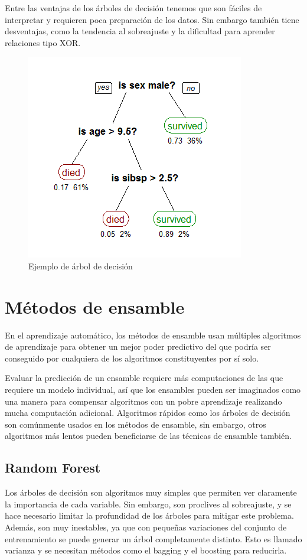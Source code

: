 Entre las ventajas de los árboles de decisión tenemos que son fáciles de interpretar y requieren poca preparación de los datos. Sin embargo también tiene desventajas, como la tendencia al sobreajuste y la dificultad para aprender relaciones tipo XOR.

\begin{figure}
    \centering
    \caption{Ejemplo de árbol de decisión}
    \label{fig:dt-eg}
    \includegraphics[width=0.6\linewidth]{graficos/dt_example.png}
\end{figure}

\section{Métodos de ensamble}

En el aprendizaje automático, los métodos de ensamble usan múltiples algoritmos de aprendizaje para obtener un mejor poder predictivo del que podría ser conseguido por cualquiera de los algoritmos constituyentes por sí solo.

Evaluar la predicción de un ensamble requiere más computaciones de las que requiere un modelo individual, así que los ensambles pueden ser imaginados como una manera para compensar algoritmos con un pobre aprendizaje realizando mucha computación adicional. Algoritmos rápidos como los árboles de decisión son comúnmente usados en los métodos de ensamble, sin embargo, otros algoritmos más lentos pueden beneficiarse de las técnicas de ensamble también.

\subsection{Random Forest}

Los árboles de decisión son algoritmos muy simples que permiten ver claramente la importancia de cada variable. Sin embargo, son proclives al sobreajuste, y se hace necesario limitar la profundidad de los árboles para mitigar este problema. Además, son muy inestables, ya que con pequeñas variaciones del conjunto de entrenamiento se puede generar un árbol completamente distinto. Esto es llamado varianza y se necesitan métodos como el bagging y el boosting para reducirla.

